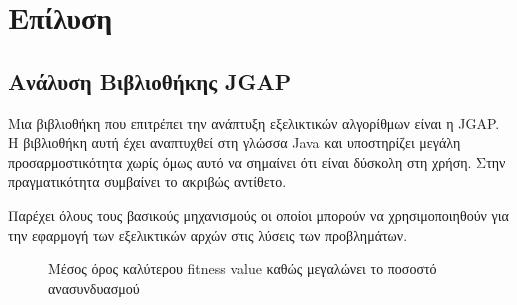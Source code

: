 \section{Επίλυση}

\subsection{Ανάλυση Βιβλιοθήκης JGAP}

Μια βιβλιοθήκη που επιτρέπει την ανάπτυξη εξελικτικών αλγορίθμων είναι η JGAP. Η βιβλιοθήκη αυτή έχει αναπτυχθεί στη γλώσσα Java και υποστηρίζει μεγάλη προσαρμοστικότητα χωρίς όμως αυτό να σημαίνει ότι είναι δύσκολη στη χρήση. Στην πραγματικότητα συμβαίνει το ακριβώς αντίθετο.

Παρέχει όλους τους βασικούς μηχανισμούς οι οποίοι μπορούν να χρησιμοποιηθούν για την εφαρμογή των εξελικτικών αρχών στις λύσεις των προβλημάτων. \cite{Meffert}

\begin{figure}[!t]
    \centering
    \caption{Μέσος όρος καλύτερου fitness value καθώς μεγαλώνει το ποσοστό ανασυνδυασμού}
    \label{fig_crossover}
\end{figure}

